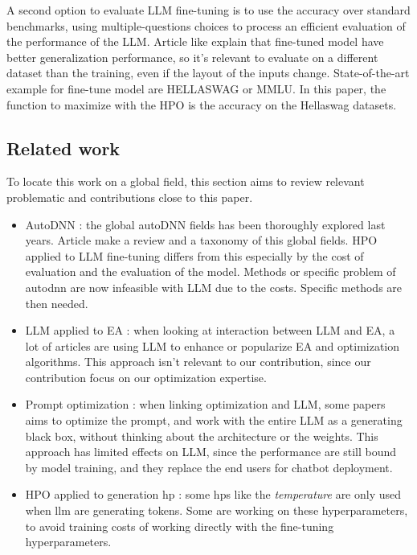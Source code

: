 A second option to evaluate LLM fine-tuning is to use the accuracy over standard benchmarks, using multiple-questions choices to process an efficient evaluation of the performance of the LLM. Article like \cite{wei_finetuned_2022} explain that fine-tuned model have better generalization performance, so it's relevant to evaluate on a different dataset than the training, even if the layout of the inputs change. State-of-the-art example for fine-tune model are HELLASWAG\cite{zellers_hellaswag_2019} or MMLU\cite{hendryckstest2021,hendrycks2021ethics}. In this paper, the function to maximize with the HPO is the accuracy on the Hellaswag datasets.



\subsection{Related work}
\label{sec:related}
To locate this work on a global field, this section aims to review relevant problematic and contributions close to this paper. 

\begin{itemize}
    \item AutoDNN : the global autoDNN fields has been thoroughly explored last years. Article \cite{talbi_automated_2021} make a review and a taxonomy of this global fields. HPO applied to LLM fine-tuning differs from this especially by the cost of evaluation and the evaluation of the model. Methods or specific problem of \acrshort{autodnn} are now infeasible with LLM due to the costs. Specific methods are then needed.
    \item LLM applied to EA : when looking at interaction between LLM and EA, a lot of articles \cite{liu_large_2024,cai_exploring_2024,brahmachary_large_2024} are using LLM to enhance or popularize EA and optimization algorithms. This approach isn't relevant to our contribution, since our contribution focus on our optimization expertise. 
    \item Prompt optimization : when linking optimization and LLM, some papers \cite{diao_black-box_2023,xu_gps_2022} aims to optimize the prompt, and work with the entire LLM as a generating black box, without thinking about the architecture or the weights. This approach has limited effects on LLM, since the performance are still bound by model training, and they replace the end users for chatbot deployment. 
    \item HPO applied to generation \gls{hp} : some \glspl{hp} like the \textit{temperature} are only used when \acrshort{llm} are generating tokens. Some are working on these hyperparameters, to avoid training costs of working directly with the fine-tuning hyperparameters.  
\end{itemize}



